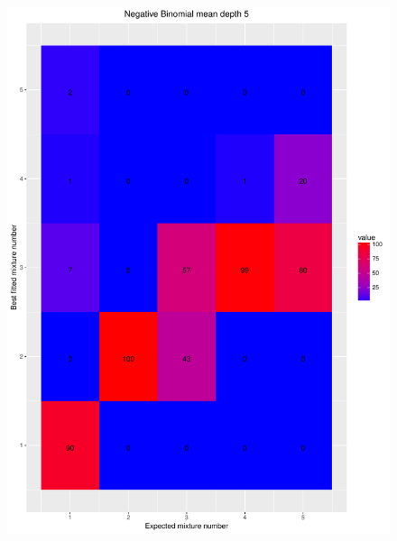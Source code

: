\documentclass[11pt]{article}
\begin{document}
\begin{figure}[H]
\begin{center}
\includegraphics[scale=0.27]{../Results/Second_Analysis/Negative_Binomial_Confusion_Matrix_5.pdf}

\end{center}
\end{figure}
\end{document}
